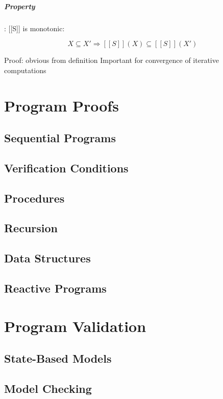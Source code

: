 \documentclass[12pt, a4paper]{book}
\begin{document}
\paragraph{Property}: [[S]] is monotonic:

$$
X \subseteq X' \Rightarrow [[S]](X) \subseteq [[S]](X')
$$

\noindent Proof: obvious from definition \newline
Important for convergence of iterative computations

  \chapter{Program Proofs}
  \label{chap:Program Proofs}
  \section{Sequential Programs}
  \label{sec:Sequential Programs}
  \section{Verification Conditions}
  \label{sec:Verification Conditions}
  \section{Procedures}
  \label{sec:Procedures}
  \section{Recursion}
  \label{sec:Recursion}
  \section{Data Structures}
  \label{sec:Data Structures}
  \section{Reactive Programs}
  \label{sec:Reactive Programs}
  \chapter{Program Validation}
  \label{chap:Program Validation}
  \section{State-Based Models}
  \label{sec:State-Based Models}
  \section{Model Checking}
  \label{sec:Model Checking}
\end{document}
